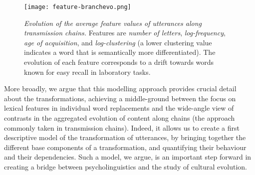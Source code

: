 \documentclass[english,]{article}
\begin{document}
\begin{figure}[!ht]
	\centering
	\texttt{[image: feature-branchevo.png]}
	\caption{\emph{Evolution of the average feature values of utterances along transmission chains.}
	Features are \emph{number of letters}, \emph{log-frequency}, \emph{age of acquisition}, and \emph{log-clustering} (a lower clustering value indicates a word that is semantically more differentiated).
	The evolution of each feature corresponds to a drift towards words known for easy recall in laboratory tasks.}
	\label{fig:branchevo}
\end{figure}

More broadly, we argue that this modelling approach provides crucial detail about the transformations, achieving a middle-ground between the focus on lexical features in individual word replacements and the wide-angle view of contrasts in the aggregated evolution of content along chains (the approach commonly taken in transmission chains).
Indeed, it allows us to create a first descriptive model of the transformation of utterances, by bringing together the different base components of a transformation, and quantifying their behaviour and their dependencies.
Such a model, we argue, is an important step forward in creating a bridge between psycholinguistics and the study of cultural evolution.

\end{document}
